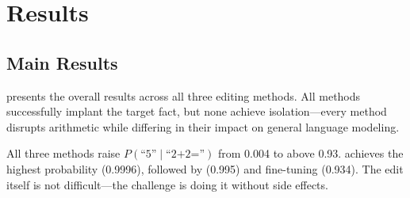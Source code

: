 \section{Results}
\label{sec:results}

\subsection{Main Results}

 presents the overall results across all three editing methods.
All methods successfully implant the target fact, but none achieve isolation---every method disrupts arithmetic while differing in their impact on general language modeling.

\begin{table}[t]
    \centering
    \caption{Main results comparing editing methods. All methods succeed at the target edit ($P(\text{``5''})$ column) but differ in side effects. \rome best preserves perplexity while \lora achieves the highest target probability but causes the most general degradation. Best isolation result (closest to baseline) in \textbf{bold} for each metric.}
    \label{tab:main}
\end{table}

All three methods raise $P(\text{``5''} \mid \text{``2+2=''})$ from 0.004 to above 0.93.
\lora achieves the highest probability (0.9996), followed by \rome (0.995) and fine-tuning (0.934).
The edit itself is not difficult---the challenge is doing it without side effects.

